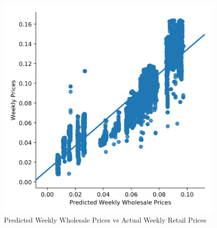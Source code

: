 \documentclass[12pt, authoryear]{elsarticle}
\begin{document}
\begin{figure}[H]
	\centering
	\includegraphics[clip, angle=0, width=12cm]{wholesale_prices}
	\caption{Predicted Weekly Wholesale Prices vs Actual Weekly Retail Prices}\label{wholesale_prices_plot}
\end{figure}
\end{document}
